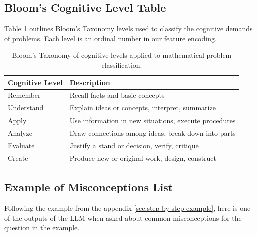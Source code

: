 \documentclass[
    a4paper, %
    10pt, %
    twoside, %
]{LTJournalArticle}
\begin{document}
\subsection{Bloom's Cognitive Level Table}
Table \ref{tab:blooms-taxonomy} outlines Bloom's Taxonomy levels used to classify the cognitive demands of problems. Each level is an ordinal number in our feature encoding.
\begin{table}[H]
    \centering
    \begin{tabular}{p{}p{}}
        \hline
        \textbf{Cognitive Level} & \textbf{Description} \\
        \hline
        Remember & Recall facts and basic concepts \\
        Understand & Explain ideas or concepts, interpret, summarize \\
        Apply & Use information in new situations, execute procedures \\
        Analyze & Draw connections among ideas, break down into parts \\
        Evaluate & Justify a stand or decision, verify, critique \\
        Create & Produce new or original work, design, construct \\
        \hline
    \end{tabular}
    \caption{Bloom's Taxonomy of cognitive levels applied to mathematical problem classification.}
    \label{tab:blooms-taxonomy}
\end{table}

\subsection{Example of Misconceptions List}
Following the example from the appendix \ref{sec:step-by-step-example}, here is one of the outputs of the LLM when asked about common misconceptions for the question in the example.
\end{document}
